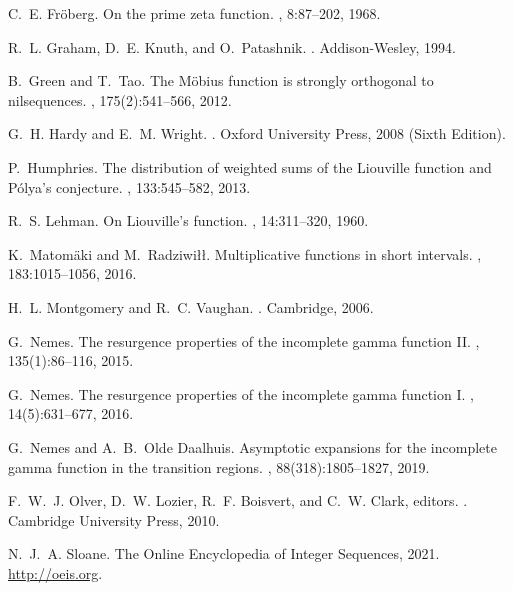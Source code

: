 \documentclass[11pt,reqno,a4letter]{article}
\numberwithin{equation}{section}
\numberwithin{figure}{section}
\numberwithin{table}{section}
\theoremstyle{plain}
\numberwithin{theorem}{section}
\theoremstyle{definition}
\theoremstyle{remark}
\begin{document}
\begin{thebibliography}{10}
C.~E. Fr{\"{o}}berg.
\newblock On the prime zeta function.
, 8:87--202, 1968.

R.~L. Graham, D.~E. Knuth, and O.~Patashnik.
.
\newblock Addison-Wesley, 1994.

B.~Green and T.~Tao.
\newblock The {M}\"{o}bius function is strongly orthogonal to nilsequences.
, 175(2):541--566, 2012.

G.~H. Hardy and E.~M. Wright.
.
\newblock Oxford University Press, 2008 (Sixth Edition).

P.~Humphries.
\newblock The distribution of weighted sums of the {L}iouville function and
  {P}\'{o}lya's conjecture.
, 133:545--582, 2013.

R.~S. Lehman.
\newblock On {L}iouville's function.
, 14:311--320, 1960.

K.~Matom{\"{a}}ki and M.~Radziwi{\l\l}.
\newblock Multiplicative functions in short intervals.
, 183:1015--1056, 2016.

H.~L. Montgomery and R.~C. Vaughan.
.
\newblock Cambridge, 2006.

G.~Nemes.
\newblock The resurgence properties of the incomplete gamma function {II}.
, 135(1):86--116, 2015.

G.~Nemes.
\newblock The resurgence properties of the incomplete gamma function {I}.
, 14(5):631--677, 2016.

G.~Nemes and A.~B.~Olde Daalhuis.
\newblock Asymptotic expansions for the incomplete gamma function in the
  transition regions.
, 88(318):1805--1827, 2019.

F.~W.~J. Olver, D.~W. Lozier, R.~F. Boisvert, and C.~W. Clark, editors.
.
\newblock Cambridge University Press, 2010.

N.~J.~A. Sloane.
\newblock The {O}nline {E}ncyclopedia of {I}nteger {S}equences, 2021.
\newblock \url{http://oeis.org}.


\end{thebibliography}
\end{document}
